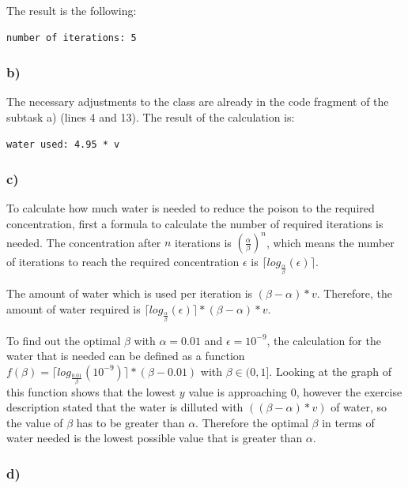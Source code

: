 The result is the following:

\begin{lstlisting}[caption=Result of 2.5 a), keywordstyle=\color{black}]
number of iterations: 5
\end{lstlisting}


\subsubsection{b)}

The necessary adjustments to the class are already in the code fragment of the subtask a) (lines 4 and 13). The result of the calculation is:

\begin{lstlisting}[caption=Result of 2.5 b), keywordstyle=\color{black}]
water used: 4.95 * v
\end{lstlisting}


\subsubsection{c)}

To calculate how much water is needed to reduce the poison to the required concentration, first a formula to calculate the number of required iterations is needed.
The concentration after $n$ iterations is $(\frac{\alpha}{\beta})^n$, which means the number of iterations to reach the required concentration $\epsilon$ is $\lceil log_{\frac{\alpha}{\beta}}(\epsilon) \rceil$.

The amount of water which is used per iteration is $(\beta - \alpha) * v$. Therefore, the amount of water required is $\lceil log_{\frac{\alpha}{\beta}}(\epsilon) \rceil * (\beta - \alpha) * v$.

To find out the optimal $\beta$ with $\alpha = 0.01$ and $\epsilon = 10^{-9}$, the calculation for the water that is needed can be defined as a function $f(\beta) = \lceil log_{\frac{0.01}{\beta}}(10^{-9}) \rceil * (\beta - 0.01)$ with $\beta \in (0, 1]$. Looking at the graph of this function shows that the lowest $y$ value is approaching 0, however the exercise description stated that the water is dilluted with $((\beta - \alpha) * v)$ of water, so the value of $\beta$ has to be greater than $\alpha$. Therefore the optimal $\beta$ in terms of water needed is the lowest possible value that is greater than $\alpha$.


\subsubsection{d)}

